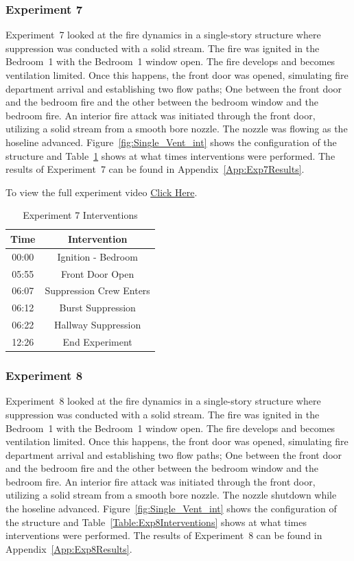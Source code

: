 \documentclass[12pt,oneside]{book}
\begin{document}
\FloatBarrier

\subsubsection{Experiment 7}
Experiment~7 looked at the fire dynamics in a single-story structure where suppression was conducted with a solid stream. The fire was ignited in the Bedroom~1 with the Bedroom~1 window open. The fire develops and becomes ventilation limited. Once this happens, the front door was opened, simulating fire department arrival and establishing two flow paths; One between the front door and the bedroom fire and the other between the bedroom window and the bedroom fire. An interior fire attack was initiated through the front door, utilizing a solid stream from a smooth bore nozzle. The nozzle was flowing as the hoseline advanced. Figure~\ref{fig:Single_Vent_int} shows the configuration of the structure and Table~\ref{Table:Exp7Interventions} shows at what times interventions were performed. The results of Experiment~7 can be found in Appendix~\ref{App:Exp7Results}. 

To view the full experiment video \href{https://player.vimeo.com/video/170513517?autoplay=1}{Click Here}.

\begin{table}[H]
	\centering
	\caption{Experiment 7 Interventions}
	\begin{tabular}{|c|c|} 
		\hline
		Time & Intervention \\ \hline \hline
		00:00 & Ignition - Bedroom \\ \hline
		05:55 & Front Door Open \\ \hline
		06:07 & Suppression Crew Enters\\ \hline
		06:12 & Burst Suppression \\ \hline 
		06:22 & Hallway Suppression \\ \hline
		12:26 & End Experiment\\ \hline
	\end{tabular}
	\label{Table:Exp7Interventions}
\end{table}

\FloatBarrier

\subsubsection{Experiment 8}
Experiment~8 looked at the fire dynamics in a single-story structure where suppression was conducted with a solid stream. The fire was ignited in the Bedroom~1 with the Bedroom~1 window open. The fire develops and becomes ventilation limited. Once this happens, the front door was opened, simulating fire department arrival and establishing two flow paths; One between the front door and the bedroom fire and the other between the bedroom window and the bedroom fire. An interior fire attack was initiated through the front door, utilizing a solid stream from a smooth bore nozzle. The nozzle shutdown while the hoseline advanced. Figure~\ref{fig:Single_Vent_int} shows the configuration of the structure and Table~\ref{Table:Exp8Interventions} shows at what times interventions were performed. The results of Experiment~8 can be found in Appendix~\ref{App:Exp8Results}. 
\end{document}
